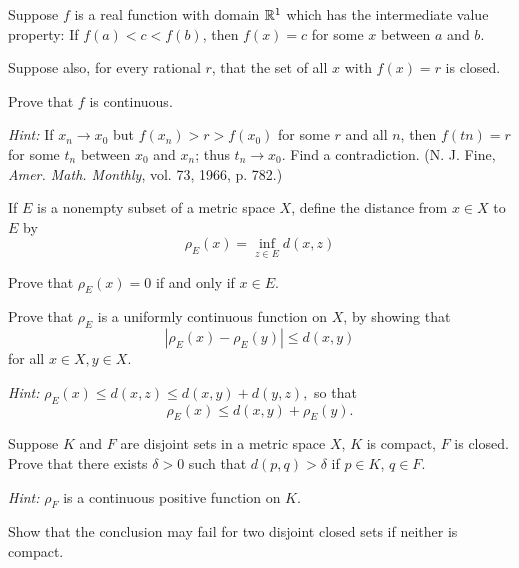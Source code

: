 \begin{myexercise}
    \label{ex:4.19}
    Suppose $f$ is a real function with domain ${\protect\mathbb R}^1$ which has the intermediate value property: 
    If $f(a)< c <f(b)$, then $f(x) = c$ for some $x$ between $a$ and $b$.
    
    Suppose also, for every rational $r$, that the set of all $x$ with $f(x) = r$ is closed. 
    
    Prove that $f$ is continuous.
    
    \emph{Hint:} If $x_n \rightarrow x_0$ but $f(x_n) > r > f(x_0)$ for some $r$ and all $n$, 
    then $f(tn) = r$ for some $t_n$ between $x_0$ and $x_n$; 
    thus $t_n \rightarrow x_0$. 
    Find a contradiction. 
    (N. J. Fine, \emph{Amer. Math. Monthly}, vol. 73, 1966, p. 782.)
\end{myexercise}


\begin{myexercise}
    \label{ex:4.20}
    If $E$ is a nonempty subset of a metric space $X$, 
    define the distance from $x \in X$ to $E$ by
    \begin{equation*}
        \rho_{E}(x)  = \inf_{z \in E} d(x,z)
    \end{equation*}
    \begin{asparaenum}[(a)]
    \item Prove that $\rho_E(x) = 0$ if and only if $x \in E$.
    \item Prove that $\rho_E$ is a uniformly continuous function on $X$, by showing that
    \begin{equation*}
        \left| \rho_E(x) - \rho_E(y) \right| \leq d(x, y)
    \end{equation*}
    for all $x \in X, y \in X$.
    \end{asparaenum}
    \emph{Hint:} $\rho_E(x) \leq d(x, z) \leq d(x, y) + d(y, z),$ 
    so that
    \begin{equation*}
        \rho_E(x) \leq d(x, y) + \rho_E(y).
    \end{equation*}
\end{myexercise}


\begin{myexercise}
    \label{ex:4.21}
    Suppose $K$ and $F$ are disjoint sets in a metric space $X$, $K$ is compact, $F$ is closed. 
    Prove that there exists $\delta > 0$ 
    such that $d(p, q) > \delta$ if $p \in K$, $q \in F$. 
    
    \emph{Hint:} $\rho_F$ is a continuous positive function on $K$.

    Show that the conclusion may fail for two disjoint closed sets if neither is compact.
\end{myexercise}


